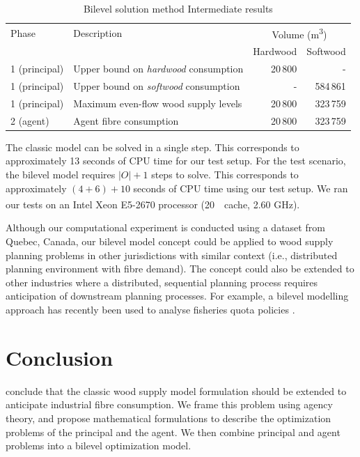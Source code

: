 \begin{table}
\caption{Bilevel solution method Intermediate results}
\label{tab:scenarios}
\renewcommand{\tabcolsep}{2pt}
\begin{tabular}{llrr}
\toprule 
Phase & Description & \multicolumn{2}{c}{Volume (\si{\cubic\metre})} \tabularnewline
&& Hardwood & Softwood \tabularnewline
\midrule
1 (principal) & Upper bound on \emph{hardwood} consumption & 20\,800 & - \tabularnewline
1 (principal) & Upper bound on \emph{softwood} consumption & - & 584\,861 \tabularnewline
1 (principal) & Maximum even-flow wood supply levels & 20\,800 & 323\,759 \tabularnewline
2 (agent) & Agent fibre consumption & 20\,800 & 323\,759 \tabularnewline
\bottomrule
\end{tabular}
\end{table}

The classic model can be solved in a single step.
This corresponds to approximately 13 seconds of CPU time for our test setup.
For the test scenario, the bilevel model requires $\left|O\right| + 1$ steps to solve.
This corresponds to approximately $(4 + 6) + 10$ seconds of CPU time using our test setup.
We ran our tests on an Intel\textsuperscript{\textregistered} Xeon\textsuperscript{\textregistered} E5-2670 processor (20\,\si{\mega\byte} cache, 2.60 \si{\giga\hertz}).

Although our computational experiment is conducted using a dataset from Quebec, Canada, our bilevel model concept could be applied to wood supply planning problems in other jurisdictions with similar context (i.e., distributed planning environment with fibre demand). The concept could also be extended to other industries where a distributed, sequential planning process requires anticipation of downstream planning processes. For example, a bilevel modelling approach has recently been used to analyse fisheries quota policies \citep{vandijk2014solving}.
 

\section{Conclusion}
\label{sec:conclusion2}

\citet{paradis2013risk} conclude that the classic wood supply model formulation should be extended to anticipate industrial fibre consumption. 
We frame this problem using agency theory, and propose mathematical formulations to describe the optimization problems of the principal and the agent. 
We then combine principal and agent problems into a bilevel optimization model. 

